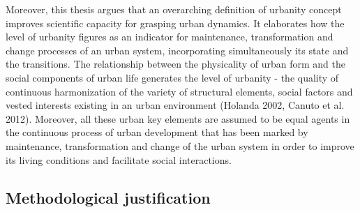 \documentclass[11pt]{report}
\begin{document}
Moreover, this thesis argues that an overarching definition of urbanity concept improves scientific capacity for grasping urban dynamics. It elaborates how the level of urbanity figures as an indicator for maintenance, transformation and change processes of an urban system, incorporating simultaneously its state and the transitions. The relationship between the physicality of urban form and the social components of urban life generates the level of urbanity - the quality of continuous harmonization of the variety of structural elements, social factors and vested interests existing in an urban environment (Holanda 2002, Canuto et al. 2012). Moreover, all these urban key elements are assumed to be equal agents in the continuous process of urban development that has been marked by maintenance, transformation and change of the urban system in order to improve its living conditions and facilitate social interactions.

\subsection{Methodological justification}
\end{document}
